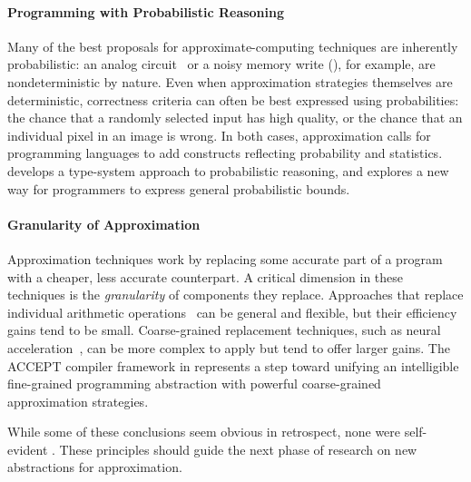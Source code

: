 \paragraph{Programming with Probabilistic Reasoning}
Many of the best proposals for approximate-computing techniques are inherently
probabilistic:
an analog circuit~\cite{anpu} or a noisy memory write (),
for example, are nondeterministic by nature.
Even when approximation strategies themselves are deterministic, correctness
criteria can often be best expressed using probabilities: the chance that a
randomly selected input has high quality, or the chance that an individual
pixel in an image is wrong.
In both cases, approximation calls for programming languages to add constructs
reflecting probability and statistics.
 develops a type-system approach to probabilistic reasoning,
and  explores a new way for programmers to express
general probabilistic bounds.

\paragraph{Granularity of Approximation}
Approximation techniques work by replacing some accurate part of a program
with a cheaper, less accurate counterpart.
A critical dimension in these techniques is the \emph{granularity} of
components they replace.
Approaches that replace individual arithmetic operations~\cite{truffle} can be
general and flexible, but their efficiency gains tend to be small.
Coarse-grained replacement techniques, such as neural acceleration~\cite{npu},
can be more complex to apply
but tend to offer larger gains.
The ACCEPT compiler framework in  represents a step toward
unifying an intelligible fine-grained programming abstraction
with powerful coarse-grained approximation strategies.

\vspace{\baselineskip}
\noindent
While some of these conclusions seem obvious in retrospect, none were
self-evident .
These principles should guide the next phase of research on new abstractions
for approximation.
